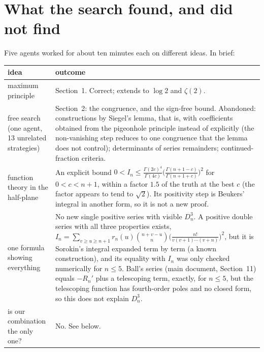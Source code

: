 \documentclass[11pt]{article}
\begin{document}
\section{What the search found, and did not find}

Five agents worked for about ten minutes each on different ideas. In brief:

\begin{center}\small
\begin{tabular}{@{}p{38mm}p{112mm}@{}}
\toprule
idea & outcome\\
\midrule
maximum principle & Section~1. Correct; extends to $\log2$ and $\zeta(2)$.\\
free search (one agent, 13 unrelated strategies) & Section~2: the congruence, and the sign-free
bound. Abandoned: constructions by Siegel's lemma, that is, with coefficients obtained from the
pigeonhole principle instead of explicitly (the non-vanishing step reduces to one congruence that
the lemma does not control); determinants of series remainders; continued-fraction criteria.\\
function theory in the half-plane & An explicit bound
$0<I_n\le\frac{\Gamma(2c)^4}{\Gamma(4c)}\bigl(\frac{\Gamma(n+1-c)}{\Gamma(n+1+c)}\bigr)^2$ for
$0<c<n+1$, within a factor $1.5$ of the truth at the best $c$ (the factor appears to tend to
$\sqrt2$). Its positivity step is Beukers' integral in another form, so it is not a new proof.\\
one formula showing everything & No new single positive series with visible $D_n^3$. A positive
double series with all three properties exists,
$I_n=\sum_{v\ge u\ge n+1}r_n(u)\binom{n+v-u}{n}\bigl(\frac{n!}{v(v+1)\cdots(v+n)}\bigr)^2$, but it is
Sorokin's integral expanded term by term (a known construction), and its equality with $I_n$ was
only checked numerically for $n\le5$. Ball's series (main document, Section~11) equals $-R_n'$ plus
a telescoping term, exactly, for $n\le5$, but the telescoping function has fourth-order poles and no
closed form, so this does not explain $D_n^3$.\\
is our combination the only one? & No. See below.\\
\bottomrule
\end{tabular}
\end{center}
\end{document}
